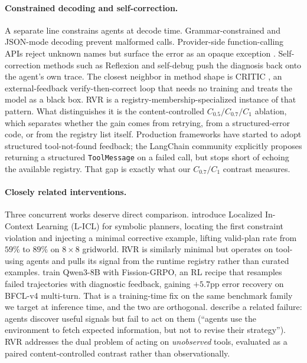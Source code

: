 \paragraph{Constrained decoding and self-correction.}
A separate line constrains agents at decode time. Grammar-constrained
and JSON-mode decoding \citep{outlines2023,jsonmode2024} prevent
malformed calls. Provider-side function-calling APIs reject unknown
names but surface the error as an opaque exception
\citep{openaitools2024,anthropictools2024}. Self-correction methods
such as Reflexion \citep{reflexion2023} and self-debug
\citep{selfdebug2023} push the diagnosis back onto the agent's own
trace. The closest neighbor in method shape is CRITIC
\citep{gou2024critic}, an external-feedback verify-then-correct loop
that needs no training and treats the model as a black box. RVR is a
registry-membership-specialized instance of that pattern. What
distinguishes it is the content-controlled $C_{0.5}/C_{0.7}/C_1$
ablation, which separates whether the gain comes from retrying, from
a structured-error code, or from the registry list itself. Production
frameworks have started to adopt structured tool-not-found feedback;
the LangChain community \citep{langchain_toolnotfound2025} explicitly
proposes returning a structured \texttt{ToolMessage} on a failed call,
but stops short of echoing the available registry. That gap is exactly
what our $C_{0.7}/C_1$ contrast measures.

\paragraph{Closely related interventions.}
Three concurrent works deserve direct comparison. \citet{licl2026}
introduce Localized In-Context Learning (L-ICL) for symbolic planners,
locating the first constraint violation and injecting a minimal
corrective example, lifting valid-plan rate from $59\%$ to $89\%$ on
$8{\times}8$ gridworld. RVR is similarly minimal but operates on
tool-using agents and pulls its signal from the runtime registry rather
than curated examples. \citet{fissiongrpo2026} train Qwen3-8B with
Fission-GRPO, an RL recipe that resamples failed trajectories with
diagnostic feedback, gaining $+5.7$pp error recovery on BFCL-v4
multi-turn. That is a training-time fix on the same benchmark family
we target at inference time, and the two are orthogonal.
\citet{englander2026} describe a related failure: agents discover
useful signals but fail to act on them (``agents use the environment
to fetch expected information, but not to revise their strategy'').
RVR addresses the dual problem of acting on \emph{unobserved} tools,
evaluated as a paired content-controlled contrast rather than
observationally.

